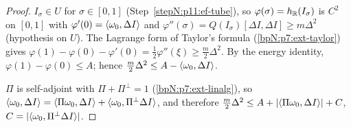 \begin{proof}
\label{stepN:p11:ef-en-taylor} $I_\sigma\in U$ for $\sigma\in[0,1]$ (Step~\ref{stepN:p11:ef-tube}), so $\varphi(\sigma)=h_{\mathbb{R}}(I_\sigma)$ is $C^2$ on $[0,1]$ with $\varphi'(0)=\langle \omega_0,\Delta I\rangle$ and $\varphi''(\sigma)=Q(I_\sigma)[\Delta I,\Delta I]\ge m\Delta^2$ (hypothesis on $U$). The Lagrange form of Taylor's formula (\ref{bpN:p7:ext-taylor}) gives $\varphi(1)-\varphi(0)-\varphi'(0)=\frac12\varphi''(\xi)\ge\frac m2\Delta^2$. By the energy identity, $\varphi(1)-\varphi(0)\le A$; hence $\frac m2\Delta^2\le A-\langle \omega_0,\Delta I\rangle$.

\label{stepN:p11:ef-en-split} $\Pi$ is self-adjoint with $\Pi+\Pi^\perp=1$ (\ref{bpN:p7:ext-linalg}), so $\langle \omega_0,\Delta I\rangle=\langle \Pi\omega_0,\Delta I\rangle+\langle \omega_0,\Pi^\perp\Delta I\rangle$, and therefore
$\frac m2\Delta^2\le A+\lvert \langle \Pi\omega_0,\Delta I\rangle\rvert+C$, $C=\lvert \langle \omega_0,\Pi^\perp\Delta I\rangle\rvert$.


\end{proof}
